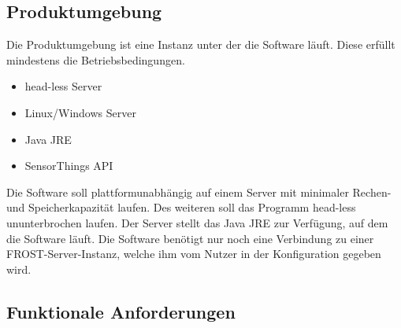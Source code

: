 \documentclass[12 pt]{article}
\begin{document}
\subsection{Produktumgebung}
Die Produktumgebung ist eine Instanz unter der die Software läuft. Diese erfüllt mindestens die Betriebsbedingungen.
\begin{itemize}
\item head-less Server
\item Linux/Windows Server
\item Java JRE
\item SensorThings API
\end{itemize}
Die Software soll plattformunabhängig auf einem Server mit minimaler Rechen- und Speicherkapazität laufen. Des weiteren soll das Programm head-less ununterbrochen laufen. Der Server stellt das Java JRE zur Verfügung, auf dem die Software läuft. Die Software benötigt nur noch eine Verbindung zu einer FROST-Server-Instanz, welche ihm vom Nutzer in der Konfiguration gegeben wird.

\subsection{Funktionale Anforderungen}

\end{document}
